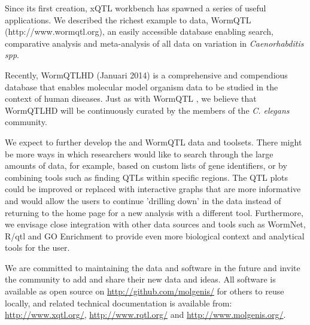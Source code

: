 Since its first creation, xQTL workbench has spawned a series of useful applications. We described 
the richest example to data, WormQTL (http://www.wormqtl.org), an easily accessible database enabling 
search, comparative analysis and meta-analysis of all data on variation in \emph{Caenorhabditis spp}. 

Recently, WormQTLHD (Januari 2014) is a comprehensive and compendious database that enables molecular 
model organism data to be studied in the context of human diseases. Just as with WormQTL \cite{Snoek:2012}, 
we believe that WormQTLHD will be continuously curated by the members of the \emph{C. elegans} community. 

We expect to further develop the \xqtlwb and WormQTL data and toolsets. There might be more ways in which 
researchers would like to search through the large amounts of data, for example, based on custom lists of 
gene identifiers, or by combining tools such as finding QTLs within specific regions. The QTL plots could 
be improved or replaced with interactive graphs that are more informative and would allow the users to 
continue 'drilling down' in the data instead of returning to the home page for a new analysis with a 
different tool. Furthermore, we envisage close integration with other data sources and tools such as WormNet, 
R/qtl and GO Enrichment to provide even more biological context and analytical tools for the user. 

We are committed to maintaining the data and software in the future and invite the community to add and 
share their new data and ideas. All software is available as open source on \url{http://github.com/molgenis/} 
for others to reuse locally, and related technical documentation is available from:\\ \url{http://www.xqtl.org/}, 
\url{http://www.rqtl.org/} and \url{http://www.molgenis.org/}.

